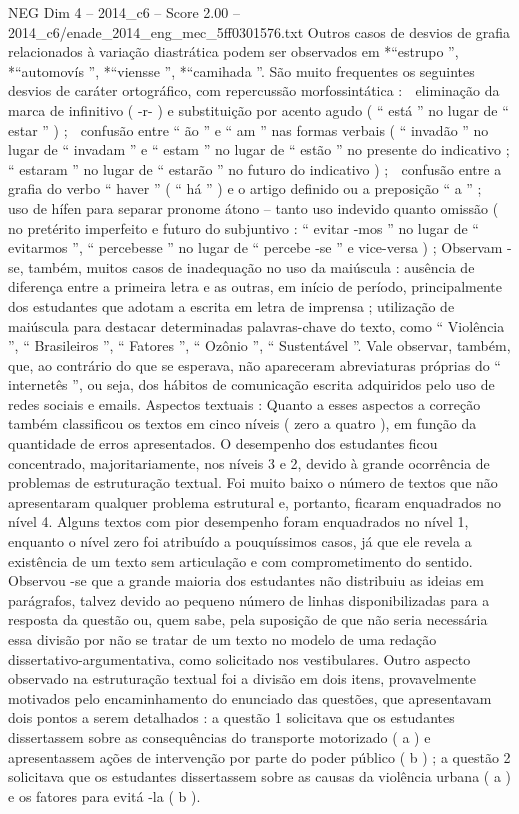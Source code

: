 \begin{textsample}{NEG Dim 4 – 2014\_c6 – Score 2.00 – 2014\_c6/enade\_2014\_eng\_mec\_5ff0301576.txt}
Outros casos de desvios de grafia relacionados à variação diastrática podem ser observados em *“estrupo ”, *“automovís ”, *“viensse ”, *“camihada ”.
São muito frequentes os seguintes desvios de caráter ortográfico, com repercussão morfossintática :  eliminação da marca de infinitivo ( -r- ) e substituição por acento agudo ( “ está ” no lugar de “ estar ” ) ;  confusão entre “ ão ” e “ am ” nas formas verbais ( “ invadão ” no lugar de “ invadam ” e “ estam ” no lugar de “ estão ” no presente do indicativo ; “ estaram ” no lugar de “ estarão ” no futuro do indicativo ) ;  confusão entre a grafia do verbo “ haver ” ( “ há ” ) e o artigo definido ou a preposição “ a ” ;  uso de hífen para separar pronome átono – tanto uso indevido quanto omissão ( no pretérito imperfeito e futuro do subjuntivo : “ evitar -mos ” no lugar de “ evitarmos ”, “ percebesse ” no lugar de “ percebe -se ” e vice-versa ) ; Observam -se, também, muitos casos de inadequação no uso da maiúscula : ausência de diferença entre a primeira letra e as outras, em início de período, principalmente dos estudantes que adotam a escrita em letra de imprensa ; utilização de maiúscula para destacar determinadas palavras-chave do texto, como “ Violência ”, “ Brasileiros ”, “ Fatores ”, “ Ozônio ”, “ Sustentável ”.
Vale observar, também, que, ao contrário do que se esperava, não apareceram abreviaturas próprias do “ internetês ”, ou seja, dos hábitos de comunicação escrita adquiridos pelo uso de redes sociais e emails.
Aspectos textuais : Quanto a esses aspectos a correção também classificou os textos em cinco níveis ( zero a quatro ), em função da quantidade de erros apresentados.
O desempenho dos estudantes ficou concentrado, majoritariamente, nos níveis 3 e 2, devido à grande ocorrência de problemas de estruturação textual.
Foi muito baixo o número de textos que não apresentaram qualquer problema estrutural e, portanto, ficaram enquadrados no nível 4.
Alguns textos com pior desempenho foram enquadrados no nível 1, enquanto o nível zero foi atribuído a pouquíssimos casos, já que ele revela a existência de um texto sem articulação e com comprometimento do sentido.
Observou -se que a grande maioria dos estudantes não distribuiu as ideias em parágrafos, talvez devido ao pequeno número de linhas disponibilizadas para a resposta da questão ou, quem sabe, pela suposição de que não seria necessária essa divisão por não se tratar de um texto no modelo de uma redação dissertativo-argumentativa, como solicitado nos vestibulares.
Outro aspecto observado na estruturação textual foi a divisão em dois itens, provavelmente motivados pelo encaminhamento do enunciado das questões, que apresentavam dois pontos a serem detalhados : a questão 1 solicitava que os estudantes dissertassem sobre as consequências do transporte motorizado ( a ) e apresentassem ações de intervenção por parte do poder público ( b ) ; a questão 2 solicitava que os estudantes dissertassem sobre as causas da violência urbana ( a ) e os fatores para evitá -la ( b ).

\end{textsample}
